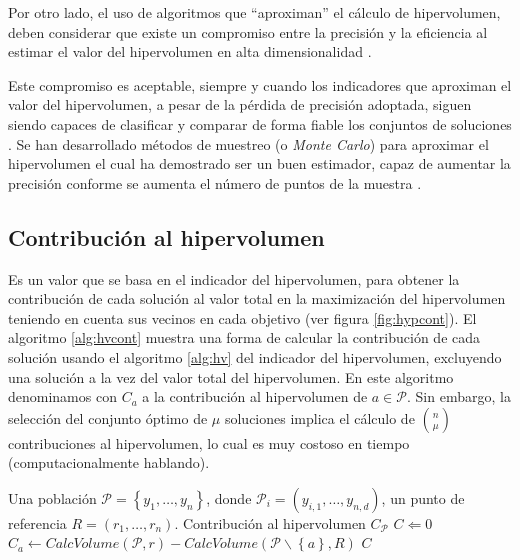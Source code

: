   Por otro lado, el uso de algoritmos que ``aproximan'' el c\'alculo de hipervolumen, deben considerar que existe un compromiso
  entre la precisi\'on y la eficiencia al estimar el valor del hipervolumen en alta dimensionalidad \cite{Braberman07, bdz2008a}.
 
  Este compromiso es aceptable, siempre y cuando los indicadores que aproximan el valor del hipervolumen, a 
  pesar de la p\'erdida de precisi\'on adoptada, siguen siendo capaces de  clasificar y comparar de forma fiable los conjuntos de soluciones 
  \cite{Bader11}. Se han desarrollado m\'etodos de muestreo (o \textit{Monte Carlo}) para aproximar el hipervolumen el cual ha 
  demostrado ser un buen estimador, capaz de aumentar la precisi\'on conforme se aumenta el n\'umero de puntos de la muestra \cite{Everson02fullelite}. 
  
  \subsection{Contribuci\'on al hipervolumen}

  Es un valor que se basa en el indicador del hipervolumen, para obtener  
  la contribuci\'on de cada soluci\'on al valor total en la maximizaci\'on del hipervolumen teniendo en cuenta sus vecinos en cada 
  objetivo (ver figura \ref{fig:hypcont}). El algoritmo \ref{alg:hvcont} muestra una forma de calcular la contribuci\'on 
  de cada soluci\'on usando el algoritmo \ref{alg:hv} del indicador del hipervolumen, excluyendo una soluci\'on a la vez
  del valor total del hipervolumen. En este algoritmo denominamos con $C_a$ a la contribuci\'on al hipervolumen de $a \in \mathcal{P}$.
  Sin embargo, la selecci\'on del conjunto \'optimo de $\mu$ soluciones implica el c\'alculo de ${n \choose \mu}$ contribuciones al 
  hipervolumen, lo cual es muy costoso en tiempo (computacionalmente hablando).
    
   \begin{algorithm}
  \begin{algorithmic}[1]			
		\REQUIRE Una poblaci\'on $\mathcal{P}=\left\{y_1,\ldots,y_n\right\}$, 
		donde $\mathcal{P}_i = \left(y_{i,1},\ldots,y_{n,d}\right) $, un punto de referencia $R=\left(r_1,\ldots,r_n\right)$.		
		\ENSURE Contribuci\'on al hipervolumen $C_{\mathcal{P}}$
		\STATE $C\Leftarrow 0$
			\STATE $C_{a} \leftarrow CalcVolume(\mathcal{P},r) - CalcVolume(\mathcal{P}\backslash \left\{a\right\},R)$
		\ENDWHILE
		\RETURN $C$
  \end{algorithmic}
  \caption{$estimandoContribucion\left(\mathcal{P}\right)$}
  \label{alg:hvcont}
  \end{algorithm}
  
